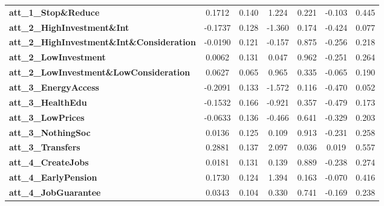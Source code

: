 \begin{center}
\begin{tabular}{lcccccc}
\textbf{att\_1\_Stop\&Reduce}                       &       0.1712  &        0.140     &     1.224  &         0.221        &       -0.103    &        0.445     \\
\textbf{att\_2\_HighInvestment\&Int}                &      -0.1737  &        0.128     &    -1.360  &         0.174        &       -0.424    &        0.077     \\
\textbf{att\_2\_HighInvestment\&Int\&Consideration} &      -0.0190  &        0.121     &    -0.157  &         0.875        &       -0.256    &        0.218     \\
\textbf{att\_2\_LowInvestment}                      &       0.0062  &        0.131     &     0.047  &         0.962        &       -0.251    &        0.264     \\
\textbf{att\_2\_LowInvestment\&LowConsideration}    &       0.0627  &        0.065     &     0.965  &         0.335        &       -0.065    &        0.190     \\
\textbf{att\_3\_EnergyAccess}                       &      -0.2091  &        0.133     &    -1.572  &         0.116        &       -0.470    &        0.052     \\
\textbf{att\_3\_HealthEdu}                          &      -0.1532  &        0.166     &    -0.921  &         0.357        &       -0.479    &        0.173     \\
\textbf{att\_3\_LowPrices}                          &      -0.0633  &        0.136     &    -0.466  &         0.641        &       -0.329    &        0.203     \\
\textbf{att\_3\_NothingSoc}                         &       0.0136  &        0.125     &     0.109  &         0.913        &       -0.231    &        0.258     \\
\textbf{att\_3\_Transfers}                          &       0.2881  &        0.137     &     2.097  &         0.036        &        0.019    &        0.557     \\
\textbf{att\_4\_CreateJobs}                         &       0.0181  &        0.131     &     0.139  &         0.889        &       -0.238    &        0.274     \\
\textbf{att\_4\_EarlyPension}                       &       0.1730  &        0.124     &     1.394  &         0.163        &       -0.070    &        0.416     \\
\textbf{att\_4\_JobGuarantee}                       &       0.0343  &        0.104     &     0.330  &         0.741        &       -0.169    &        0.238     \\

\end{tabular}
\end{center}
